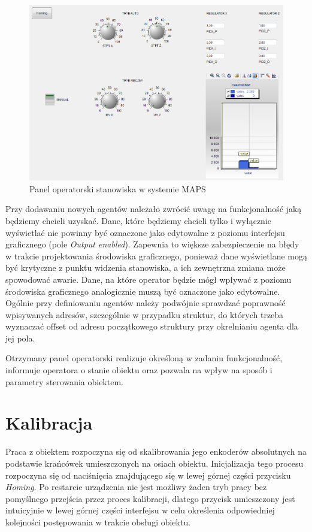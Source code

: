 \documentclass{mwrep}
\begin{document}
\begin{figure}[H]
    \label{MAPS::PanelOperatorski}
  
    \includegraphics[scale=0.45]{panel_operatorski.png}
    \caption{Panel operatorski stanowiska w systemie MAPS}
\end{figure}

Przy dodawaniu nowych agentów należało zwrócić uwagę na funkcjonalność jaką będziemy chcieli uzyskać. Dane, które będziemy chcieli tylko i wyłącznie wyświetlać nie powinny być oznaczone jako edytowalne z poziomu interfejsu graficznego (pole  \emph{Output enabled}). Zapewnia to większe zabezpieczenie na błędy w trakcie projektowania środowiska graficznego, ponieważ dane wyświetlane mogą być krytyczne z punktu widzenia stanowiska, a ich zewnętrzna zmiana może spowodować awarie. Dane, na które operator będzie mógł wpływać z poziomu środowiska graficznego analogicznie muszą być oznaczone jako edytowalne. Ogólnie przy definiowaniu agentów należy podwójnie sprawdzać poprawność wpisywanych adresów, szczególnie w przypadku struktur, do których trzeba wyznaczać offset od adresu początkowego struktury przy okrelnianiu agenta dla jej pola.

Otrzymany panel operatorski realizuje określoną w zadaniu funkcjonalność, informuje operatora o stanie obiektu oraz pozwala na wpływ na sposób i parametry sterowania obiektem.

\section{Kalibracja}
\label{MAPS::Kalibracja}

Praca z obiektem rozpoczyna się od skalibrowania jego enkoderów absolutnych na podstawie krańcówek umieszczonych na osiach obiektu. Inicjalizacja tego procesu rozpoczyna się od naciśnięcia znajdującego się w lewej górnej części przycisku \emph{Homing}. Po restarcie urządzenia nie jest możliwy żaden tryb pracy bez pomyślnego przejścia przez proces kalibracji, dlatego przycisk umieszczony jest intuicyjnie w lewej górnej części interfejsu w celu określenia odpowiedniej kolejności postępowania w trakcie obsługi obiektu.
\end{document}
